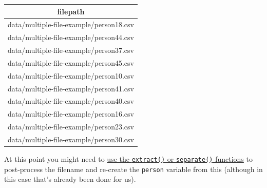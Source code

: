 \documentclass[]{article}
\theoremstyle{definition}
\theoremstyle{definition}
\theoremstyle{definition}
\theoremstyle{remark}
\begin{document}
\begin{longtable}[]{@{}c@{}}
\toprule
\begin{minipage}[b]{0.55\columnwidth}\centering\strut
filepath\strut
\end{minipage}\tabularnewline
\midrule
\endhead
\begin{minipage}[t]{0.55\columnwidth}\centering\strut
data/multiple-file-example/person18.csv\strut
\end{minipage}\tabularnewline
\begin{minipage}[t]{0.55\columnwidth}\centering\strut
data/multiple-file-example/person44.csv\strut
\end{minipage}\tabularnewline
\begin{minipage}[t]{0.55\columnwidth}\centering\strut
data/multiple-file-example/person37.csv\strut
\end{minipage}\tabularnewline
\begin{minipage}[t]{0.55\columnwidth}\centering\strut
data/multiple-file-example/person45.csv\strut
\end{minipage}\tabularnewline
\begin{minipage}[t]{0.55\columnwidth}\centering\strut
data/multiple-file-example/person10.csv\strut
\end{minipage}\tabularnewline
\begin{minipage}[t]{0.55\columnwidth}\centering\strut
data/multiple-file-example/person41.csv\strut
\end{minipage}\tabularnewline
\begin{minipage}[t]{0.55\columnwidth}\centering\strut
data/multiple-file-example/person40.csv\strut
\end{minipage}\tabularnewline
\begin{minipage}[t]{0.55\columnwidth}\centering\strut
data/multiple-file-example/person16.csv\strut
\end{minipage}\tabularnewline
\begin{minipage}[t]{0.55\columnwidth}\centering\strut
data/multiple-file-example/person23.csv\strut
\end{minipage}\tabularnewline
\begin{minipage}[t]{0.55\columnwidth}\centering\strut
data/multiple-file-example/person30.csv\strut
\end{minipage}\tabularnewline
\bottomrule
\end{longtable}

At this point you might need to
\protect\hyperlink{extract-to-split-column-names}{use the
\texttt{extract()} or \texttt{separate()} functions} to post-process the
filename and re-create the \texttt{person} variable from this (although
in this case that's already been done for us).
\end{document}
